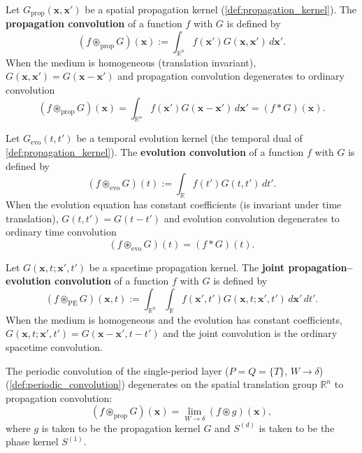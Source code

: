 \begin{definition}\label{def:propagation_convolution}
Let $G_{\text{prop}}(\mathbf{x},\mathbf{x}')$ be a spatial propagation kernel (\cref{def:propagation_kernel}). The \textbf{propagation convolution} of a function $f$ with $G$ is defined by
\[
(f \circledast_{\text{prop}} G)(\mathbf{x}) := \int_{\mathbb{R}^n}f(\mathbf{x}')G(\mathbf{x},\mathbf{x}')\,d\mathbf{x}'.
\]
When the medium is homogeneous (translation invariant), $G(\mathbf{x},\mathbf{x}') = G(\mathbf{x}-\mathbf{x}')$ and propagation convolution degenerates to ordinary convolution
\[
(f \circledast_{\text{prop}} G)(\mathbf{x}) = \int_{\mathbb{R}^n}f(\mathbf{x}')G(\mathbf{x}-\mathbf{x}')\,d\mathbf{x}' = (f * G)(\mathbf{x}).
\]
\end{definition}

\begin{definition}\label{def:evolution_convolution}
Let $G_{\text{evo}}(t,t')$ be a temporal evolution kernel (the temporal dual of \cref{def:propagation_kernel}). The \textbf{evolution convolution} of a function $f$ with $G$ is defined by
\[
(f \circledast_{\text{evo}} G)(t) := \int_{\mathbb{R}}f(t')G(t,t')\,dt'.
\]
When the evolution equation has constant coefficients (is invariant under time translation), $G(t,t') = G(t-t')$ and evolution convolution degenerates to ordinary time convolution
\[
(f \circledast_{\text{evo}} G)(t) = (f * G)(t).
\]
\end{definition}

\begin{definition}\label{def:joint_convolution}
Let $G(\mathbf{x},t;\mathbf{x}',t')$ be a spacetime propagation kernel. The \textbf{joint propagation--evolution convolution} of a function $f$ with $G$ is defined by
\[
(f \circledast_{\text{PE}} G)(\mathbf{x},t) := \int_{\mathbb{R}^n}\int_{\mathbb{R}}f(\mathbf{x}',t')G(\mathbf{x},t;\mathbf{x}',t')\,d\mathbf{x}'\,dt'.
\]
When the medium is homogeneous and the evolution has constant coefficients, $G(\mathbf{x},t;\mathbf{x}',t') = G(\mathbf{x}-\mathbf{x}', t-t')$ and the joint convolution is the ordinary spacetime convolution.
\end{definition}

\begin{theorem}\label{thm:propagation_periodic_convolution}
The periodic convolution of the single-period layer ($P=Q=\{T\}$, $W\to\delta$) (\cref{def:periodic_convolution}) degenerates on the spatial translation group $\mathbb{R}^n$ to propagation convolution:
\[
(f \circledast_{\text{prop}} G)(\mathbf{x}) = \lim_{W\to\delta}(f\circledast g)(\mathbf{x}),
\]
where $g$ is taken to be the propagation kernel $G$ and $S^{(d)}$ is taken to be the phase kernel $S^{(1)}$.
\end{theorem}


